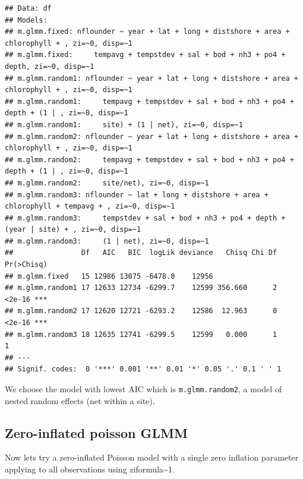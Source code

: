\documentclass[
]{article}
\begin{document}
\begin{verbatim}
## Data: df
## Models:
## m.glmm.fixed: nflounder ~ year + lat + long + distshore + area + chlorophyll + , zi=~0, disp=~1
## m.glmm.fixed:     tempavg + tempstdev + sal + bod + nh3 + po4 + depth, zi=~0, disp=~1
## m.glmm.random1: nflounder ~ year + lat + long + distshore + area + chlorophyll + , zi=~0, disp=~1
## m.glmm.random1:     tempavg + tempstdev + sal + bod + nh3 + po4 + depth + (1 | , zi=~0, disp=~1
## m.glmm.random1:     site) + (1 | net), zi=~0, disp=~1
## m.glmm.random2: nflounder ~ year + lat + long + distshore + area + chlorophyll + , zi=~0, disp=~1
## m.glmm.random2:     tempavg + tempstdev + sal + bod + nh3 + po4 + depth + (1 | , zi=~0, disp=~1
## m.glmm.random2:     site/net), zi=~0, disp=~1
## m.glmm.random3: nflounder ~ lat + long + distshore + area + chlorophyll + tempavg + , zi=~0, disp=~1
## m.glmm.random3:     tempstdev + sal + bod + nh3 + po4 + depth + (year | site) + , zi=~0, disp=~1
## m.glmm.random3:     (1 | net), zi=~0, disp=~1
##                Df   AIC   BIC  logLik deviance   Chisq Chi Df Pr(>Chisq)    
## m.glmm.fixed   15 12986 13075 -6478.0    12956                              
## m.glmm.random1 17 12633 12734 -6299.7    12599 356.660      2     <2e-16 ***
## m.glmm.random2 17 12620 12721 -6293.2    12586  12.963      0     <2e-16 ***
## m.glmm.random3 18 12635 12741 -6299.5    12599   0.000      1          1    
## ---
## Signif. codes:  0 '***' 0.001 '**' 0.01 '*' 0.05 '.' 0.1 ' ' 1
\end{verbatim}

We choose the model with lowest AIC which is \texttt{m.glmm.random2}, a
model of nested random effects (net within a site).

\subsection{Zero-inflated poisson
GLMM}\label{zero-inflated-poisson-glmm}

Now lets try a zero-inflated Poisson model with a single zero inflation
parameter applying to all observations using ziformula\textasciitilde1.
\end{document}
